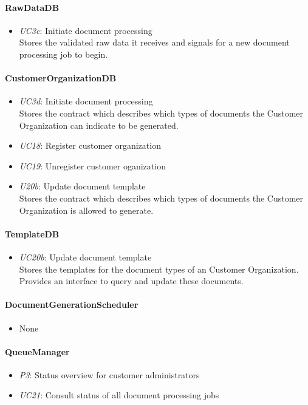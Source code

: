 \documentclass[a4paper,10pt]{article}
\begin{document}
\paragraph{RawDataDB}
\begin{itemize}
	\item \emph{UC3c}: Initiate document processing\\ Stores the validated raw data it receives and signals for a new document processing job to begin. 
\end{itemize}
\paragraph{CustomerOrganizationDB}
\begin{itemize}
	\item \emph{UC3d}: Initiate document processing\\ Stores the contract which describes which types of documents the Customer Organization can indicate to be generated.
	\item \emph{UC18}: Register customer organization
    \item \emph{UC19}: Unregister customer oganization
    \item \emph{U20b}: Update document template\\ Stores the contract which describes which types of documents the Customer Organization is allowed to generate.
\end{itemize}
\paragraph{TemplateDB}
\begin{itemize}
		\item \emph{UC20b}: Update document template\\ Stores the templates for the document types of an Customer Organization. Provides an interface to query and update these documents.
\end{itemize}
\paragraph{DocumentGenerationScheduler}
\begin{itemize}
	\item None
\end{itemize}
\paragraph{QueueManager}
\begin{itemize}
	\item \emph{P3}: Status overview for customer administrators
	\item \emph{UC21}: Consult status of all document processing jobs
\end{itemize}
\end{document}

